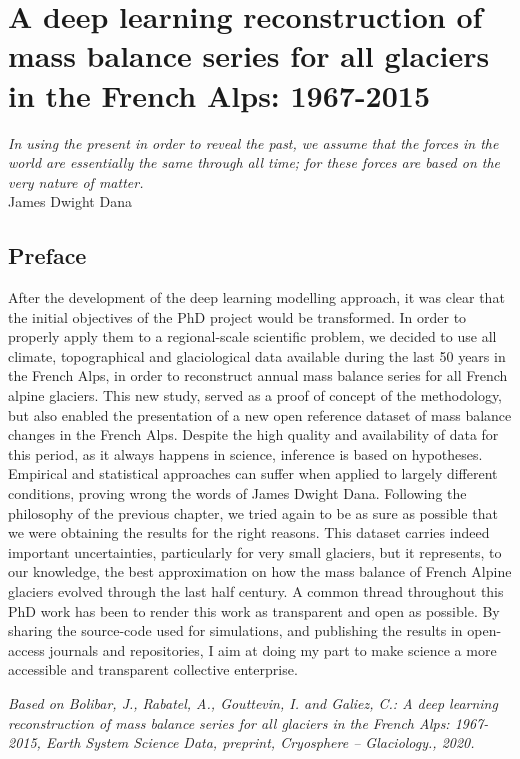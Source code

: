 \chapter{A deep learning reconstruction of mass balance series for all glaciers in the French Alps: 1967-2015}
\label{chap:past}

\begin{flushright}
{\small \textit{In using the present in order to reveal the past, we assume that the forces in the world are essentially the same through all time; for these forces are based on the very nature of matter.}\\
James Dwight Dana}
\end{flushright}

\section*{Preface}

After the development of the deep learning modelling approach, it was clear that the initial objectives of the PhD project would be transformed. In order to properly apply them to a regional-scale scientific problem, we decided to use all climate, topographical and glaciological data available during the last 50 years in the French Alps, in order to reconstruct annual mass balance series for all French alpine glaciers. This new study, served as a proof of concept of the methodology, but also enabled the presentation of a new open reference dataset of mass balance changes in the French Alps. Despite the high quality and availability of data for this period, as it always happens in science, inference is based on hypotheses. Empirical and statistical approaches can suffer when applied to largely different conditions, proving wrong the words of James Dwight Dana. Following the philosophy of the previous chapter, we tried again to be as sure as possible that we were obtaining the results for the right reasons. This dataset carries indeed important uncertainties, particularly for very small glaciers, but it represents, to our knowledge, the best approximation on how the mass balance of French Alpine glaciers evolved through the last half century. A common thread throughout this PhD work has been to render this work as transparent and open as possible. By sharing the source-code used for simulations, and publishing the results in open-access journals and repositories, I aim at doing my part to make science a more accessible and transparent collective enterprise. 

\textit{Based on Bolibar, J., Rabatel, A., Gouttevin, I. and Galiez, C.: A deep learning reconstruction of mass balance series for all glaciers in the French Alps: 1967-2015, Earth System Science Data, preprint, Cryosphere – Glaciology., 2020.}


